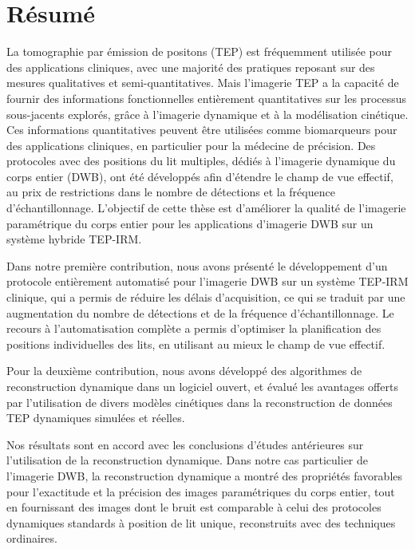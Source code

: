 \section*{Résumé}
La tomographie par émission de positons (TEP) est fréquemment utilisée pour des applications cliniques, avec une majorité des pratiques reposant sur des mesures qualitatives et semi-quantitatives. Mais l'imagerie TEP a la capacité de fournir des informations fonctionnelles entièrement quantitatives sur les processus sous-jacents explorés, grâce à l'imagerie dynamique et à la modélisation cinétique. Ces informations quantitatives peuvent être utilisées comme biomarqueurs pour des applications cliniques, en particulier pour la médecine de précision. Des protocoles avec des positions du lit multiples, dédiés à l'imagerie dynamique du corps entier (DWB), ont été développés afin d'étendre le champ de vue effectif, au prix de restrictions dans le nombre de détections et la fréquence d'échantillonnage. L'objectif de cette thèse est d'améliorer la qualité de l'imagerie paramétrique du corps entier pour les applications d'imagerie DWB sur un système hybride TEP-IRM.

Dans notre première contribution, nous avons présenté le développement d'un protocole entièrement automatisé pour l'imagerie DWB sur un système TEP-IRM clinique, qui a permis de réduire les délais d'acquisition, ce qui se traduit par une augmentation du nombre de détections et de la fréquence d'échantillonnage. Le recours à l'automatisation complète a permis d'optimiser la planification des positions individuelles des lits, en utilisant au mieux le champ de vue effectif. 

Pour la deuxième contribution, nous avons développé des algorithmes de reconstruction dynamique dans un logiciel ouvert, et évalué les avantages offerts par l'utilisation de divers modèles cinétiques dans la reconstruction de données TEP dynamiques simulées et réelles. 

Nos résultats sont en accord avec les conclusions d’études antérieures sur l'utilisation de la reconstruction dynamique. Dans notre cas particulier de l'imagerie DWB, la reconstruction dynamique a montré des propriétés favorables pour l'exactitude et la précision des images paramétriques du corps entier, tout en fournissant des images dont le bruit est comparable à celui des protocoles dynamiques standards à position de lit unique, reconstruits avec des techniques ordinaires.

